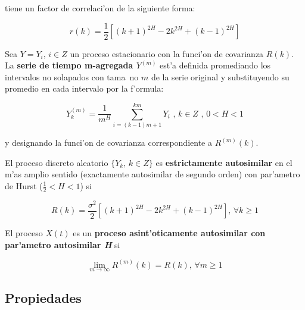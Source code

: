 tiene un factor de correlaci'on de la siguiente forma:

\begin{equation} \label{eq:correlation3}
r(k) = \frac{1}{2}[(k+1)^{2H} - 2k^{2H} + (k - 1)^{2H}]
\end{equation}

\begin{definicion} \label{def:agregado}
Sea $Y = { Y_i \text{, } i \in Z}$ un proceso estacionario con la funci'on de
covarianza $R(k)$. La {\bf serie de tiempo m-agregada $Y^{(m)}$ } est'a
definida promediando los intervalos no solapados con tama~no $m$ de la serie
original y substituyendo su promedio en cada intervalo por la f'ormula:

\begin{equation}
Y_k^{(m)} = \frac{1}{m^{H}} \sum_{i = (k - 1)m + 1}^{km}{Y_i} \text{ ,  } k \in Z \text{ ,  } 0 < H < 1
\end{equation}

y designando la funci'on de covarianza correspondiente a $R^{(m)}(k)$.
\end{definicion}

\begin{definicion} \label{def:so-autosimilar}
El proceso discreto aleatorio $\{Y_k \text{,  } k \in Z\}$ es {\bf
estrictamente autosimilar} en el m'as amplio sentido (exactamente autosimilar
de segundo orden) con par'ametro de Hurst ($\frac{1}{2} < H < 1$) si

\begin{equation} \label{eq:so-autosimilar}
R(k) = \frac{\sigma^2}{2}[(k+1)^{2H} - 2k^{2H} + (k - 1)^{2H}] \text{,  } \forall k \geq 1 
\end{equation}
\end{definicion}

\begin{definicion} \label{def:aso-autosimilar}
El proceso $X(t)$ es un {\bf proceso asint'oticamente autosimilar con 
par'ametro autosimilar {\it H}} si

\begin{equation} \label{eq:aso-autosimilar}
\lim_{m \to \infty} R^{(m)}(k) = R(k) \text{,  } \forall m \geq 1
\end{equation}
\end{definicion}

\subsection{Propiedades}


